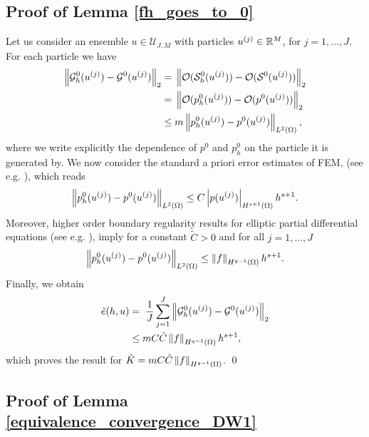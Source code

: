 \subsection*{Proof of Lemma \ref{fh_goes_to_0}}

Let us consider an ensemble $u \in \mathcal U_{J,M}$ with particles $u^{(j)} \in \mathbb{R}^M$, for $j = 1, \ldots, J$. For each particle we have 
\begin{align}
\left\|\mathcal{G}^0_h(u^{(j)}) - \mathcal{G}^0(u^{(j)})\right\|_2 = & \; \left\|\mathcal{O}(\mathcal{S}^0_h(u^{(j)})) - \mathcal{O}(\mathcal{S}^0(u^{(j)}))\right\|_2 \\
= & \; \left\|\mathcal{O}(p^0_h(u^{(j)})) - \mathcal{O}(p^0(u^{(j)}))\right\|_2 \\
\le & \; m \left\|p^0_h(u^{(j)}) - p^0(u^{(j)})\right\|_{L^2(\Omega)},
\end{align}
where we write explicitly the dependence of $p^0$ and $p^0_h$ on the particle it is generated by. We now consider the standard a priori error estimates of FEM, (see e.g. \cite[Theorem 3.2.5]{Cia02}), which reads
\[ \left\|p^0_h(u^{(j)}) - p^0(u^{(j)})\right\|_{L^2(\Omega)} \le C \left\lvert p(u^{(j)})\right\rvert_{H^{s+1}(\Omega)} h^{s+1}. \]
Moreover, higher order boundary regularity results for elliptic partial differential equations (see e.g. \cite[Theorem 6.3.5]{Eva10}), imply for a constant $\tilde{C} > 0$ and for all $j = 1, \ldots, J$
\[ \left\|p^0_h(u^{(j)}) - p^0(u^{(j)})\right\|_{L^2(\Omega)} \leq \left\|f\right\|_{H^{q-1}(\Omega)} h^{s+1}. \]
Finally, we obtain
\begin{align}
\tilde{e}(h, u) &= \; \frac1J \sum_{j=1}^J \left\|\mathcal{G}^0_h(u^{(j)}) - \mathcal{G}^0(u^{(j)})\right\|_2\\
&\le m C \tilde{C} \left\|f\right\|_{H^{q-1}(\Omega)} h^{s+1},
\end{align}
which proves the result for $\tilde{K} = m C \tilde{C} \left\|f\right\|_{H^{q-1}(\Omega)}$.
\qed

\subsection*{Proof of Lemma \ref{equivalence_convergence_DW1}}


